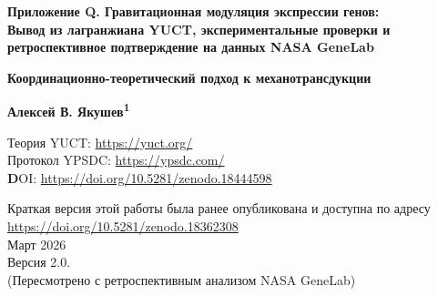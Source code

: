 \documentclass[12pt,a4paper]{article}
\theoremstyle{remark}
\begin{document}
	
	\begin{titlepage}
		\begin{center}
			\vspace*{1cm}
			
			\Huge\textbf{Приложение Q. Гравитационная модуляция экспрессии генов: \\ Вывод из лагранжиана YUCT, экспериментальные проверки и ретроспективное подтверждение на данных NASA GeneLab}
			
			\vspace{0.5cm}
			\Large\textbf{Координационно-теоретический подход к механотрансдукции}
			
			\vspace{1.5cm}
			
			\Large\textbf{Алексей В. Якушев\textsuperscript{1}}
			
			Теория YUCT: \url{https://yuct.org/}\\
			Протокол YPSDC: \url{https://ypsdc.com/}\\
			
			\vspace{2cm}
			\textbf DOI: \url{https://doi.org/10.5281/zenodo.18444598}\\
			
			\vspace{1cm}
			
			\vspace{0cm}
			\large 
			Краткая версия этой работы была ранее опубликована и доступна по адресу\\ \url{https://doi.org/10.5281/zenodo.18362308}\\
			\vspace{1cm}
			Март 2026 \\ \large Версия 2.0.
			\\ (Пересмотрено с ретроспективным анализом NASA GeneLab)
			
			\vspace{2cm}
			

\end{center}
\end{titlepage}
\end{document}
